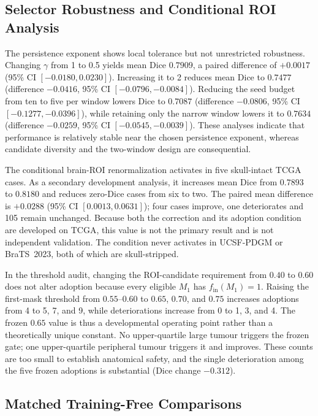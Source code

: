 \documentclass[11pt,a4paper]{article}
\begin{document}
\subsection{Selector Robustness and Conditional ROI Analysis}\label{sec:stability}

The persistence exponent shows local tolerance but not unrestricted robustness.
Changing $\gamma$ from 1 to 0.5 yields mean Dice $0.7909$, a paired difference
of $+0.0017$ (95\% CI $[-0.0180,0.0230]$). Increasing it to 2 reduces mean Dice
to $0.7477$ (difference $-0.0416$, 95\% CI $[-0.0796,-0.0084]$). Reducing the
seed budget from ten to five per window lowers Dice to $0.7087$ (difference
$-0.0806$, 95\% CI $[-0.1277,-0.0396]$), while retaining only the narrow window
lowers it to $0.7634$ (difference $-0.0259$, 95\% CI
$[-0.0545,-0.0039]$). These analyses indicate that performance is relatively
stable near the chosen persistence exponent, whereas candidate diversity and the
two-window design are consequential.

The conditional brain-ROI renormalization activates in five skull-intact
TCGA cases. As a secondary development analysis, it increases mean Dice from
$0.7893$ to $0.8180$ and reduces zero-Dice cases from six to two. The paired mean
difference is $+0.0288$ (95\% CI $[0.0013,0.0631]$); four cases improve, one
deteriorates and 105 remain unchanged. Because both the correction and its adoption
condition are developed on TCGA, this value is not the primary result and is not
independent validation. The condition never activates in UCSF-PDGM or
BraTS~2023, both of which are skull-stripped.

In the threshold audit, changing the ROI-candidate requirement from $0.40$ to
$0.60$ does not alter adoption because every eligible $M_1$ has
$f_{\mathrm{in}}(M_1)=1$. Raising the first-mask threshold from $0.55$--$0.60$
to $0.65$, $0.70$, and $0.75$ increases adoptions from 4 to 5, 7, and 9, while
deteriorations increase from 0 to 1, 3, and 4. The frozen $0.65$ value is thus a
developmental operating point rather than a theoretically unique constant. No
upper-quartile large tumour triggers the frozen gate; one upper-quartile
peripheral tumour triggers it and improves. These counts are too small to
establish anatomical safety, and the single deterioration among the five frozen
adoptions is substantial (Dice change $-0.312$).

\subsection{Matched Training-Free Comparisons}\label{sec:baselines}
\end{document}
